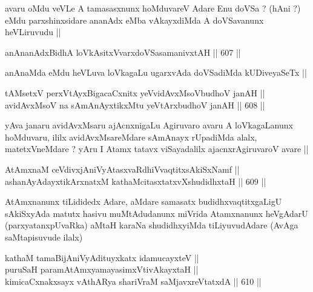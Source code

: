 \begin{artha}
avaru oMdu veVLe A tamasasxnunx hoMduvareV Adare Enu doVSa ? (hAni ?)
eMdu parxshinxsidare ananAdx eMba vAkayxdiMda A doVSavanunx
heVLiruvudu ||
\end{artha}

\begin{shl}
anAnanAdxBidhA loVkAsitxVvarxdoVSasamanivxtAH ||  607 || 
\end{shl}

\begin{artha}
anAnaMda eMdu heVLuva loVkagaLu ugarxvAda doVSadiMda kUDiveyaSeTx ||
\end{artha}

\begin{shl}
tAMsetxV perxVtAyxBigacaCxnitx yeV\s vidAvxMsoV\s budhoV janAH || \\
avidAvxMsoV na sAmAnAyxtikxMtu yeV\s tArxbudhoV janAH ||  608 || 
\end{shl}

\begin{artha}
yAva janaru avidAvxMsaru ajAcnxnigaLu Agiruvaro avaru A loVkagaLanunx
hoMduvaru, ililx avidAvxMsareMdare sAmAnayx rUpadiMda alalx,
matetxVneMdare ? yAru I Atamx tatavx viSayadalilx ajacnxrAgiruvaroV
avare ||
\end{artha}


\begin{shl}
AtAmxnaM ceVdivxjAniVyAtasxvaRdhiVvaqtitxsAkiSxNamf || \\
ashanAyAdayxtikArxnatxM kathaMcitasxtatxvXshudidhxtaH ||  609 ||  
\end{shl}

\begin{artha}
AtAmxnanunx tiLididedx Adare, aMdare samasatx budidhxvaqtitxgaLigU
sAkiSxyAda matutx hasivu muMtAdudanunx miVrida Atamxnanunx heVgAdarU
(parxyatanxpUvaRka) aMtaH karaNa shudidhxyiMda tiLiyuvudAdare (AvAga
saMtapisuvude ilalx)
\end{artha}


\begin{shl}
kathaM tamaBijAniVyAdituyxkatx idamucayxteV || \\
puruSaH paramAtAmx\s yamayasimxVtivAkayxtaH || \\
kimicaCxnakxsayx vA\s thARya shariVraM saMjavxreVtatxdA ||  610 ||  
\end{shl}

